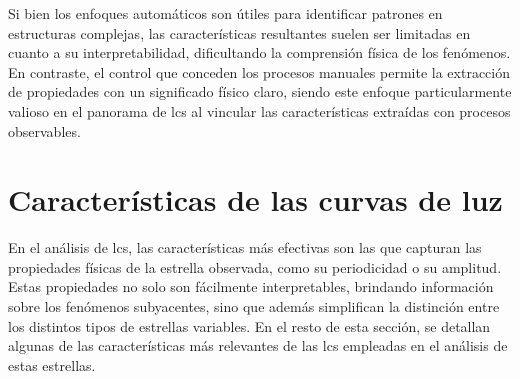 Si bien los enfoques automáticos son útiles para identificar patrones en estructuras complejas, las características resultantes suelen ser limitadas en cuanto a su interpretabilidad, dificultando la comprensión física de los fenómenos. En contraste, el control que conceden los procesos manuales permite la extracción de propiedades con un significado físico claro, siendo este enfoque particularmente valioso en el panorama de \glspl{lc} al vincular las características extraídas con procesos observables. 

\section{Características de las curvas de luz}

En el análisis de \glspl{lc}, las características más efectivas son las que capturan las propiedades físicas de la estrella observada, como su periodicidad o su amplitud. Estas propiedades no solo son fácilmente interpretables, brindando información sobre los fenómenos subyacentes, sino que además simplifican la distinción entre los distintos tipos de estrellas variables. En el resto de esta sección, se detallan algunas de las características más relevantes de las \glspl{lc} empleadas en el análisis de estas estrellas.


